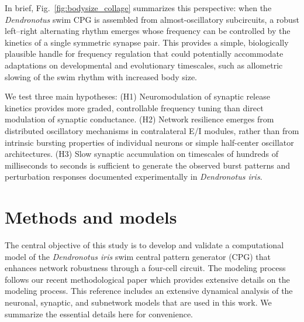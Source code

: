 \documentclass[nofootinbib,aip,amsmath,amssymb,preprint,twocolumn,floatfix,10pt]{revtex4-2}
\begin{document}
In brief, Fig.~\ref{fig:bodysize_collage} summarizes this perspective: when the \textit{Dendronotus} swim CPG is assembled from almost-oscillatory subcircuits, a robust left–right alternating rhythm emerges whose frequency can be controlled by the kinetics of a single symmetric synapse pair. This provides a simple, biologically plausible handle for frequency regulation that could potentially accommodate adaptations on developmental and evolutionary timescales, such as allometric slowing of the swim rhythm with increased body size.

We test three main hypotheses: (H1) Neuromodulation of synaptic release kinetics provides more graded, controllable frequency tuning than direct modulation of synaptic conductance. (H2) Network resilience emerges from distributed oscillatory mechanisms in contralateral E/I modules, rather than from intrinsic bursting properties of individual neurons or simple half-center oscillator architectures. (H3) Slow synaptic accumulation on timescales of hundreds of milliseconds to seconds is sufficient to generate the observed burst patterns and perturbation responses documented experimentally in \textit{Dendronotus iris}.

\section{Methods and models}
%
The central objective of this study is to develop and validate a computational model of the \textit{Dendronotus iris} swim central pattern generator (CPG) that enhances network robustness through a four-cell circuit.
The modeling process follows our recent methodological paper \cite{scully2024pairing} which provides extensive details on the modeling process.
This reference includes an extensive dynamical analysis of the neuronal, synaptic, and subnetwork models that are used in this work. We summarize the essential details here for convenience.
\end{document}
